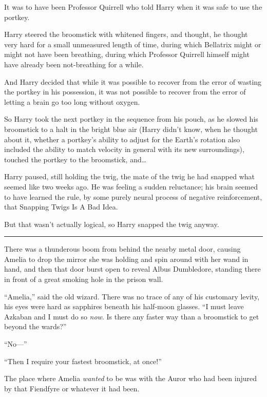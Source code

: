 It was to have been Professor Quirrell who told Harry when it was safe
to use the portkey.

Harry steered the broomstick with whitened fingers, and thought, he
thought very hard for a small unmeasured length of time, during which
Bellatrix might or might not have been breathing, during which Professor
Quirrell himself might have already been not-breathing for a while.

And Harry decided that while it was possible to recover from the error
of wasting the portkey in his possession, it was not possible to recover
from the error of letting a brain go too long without oxygen.

So Harry took the next portkey in the sequence from his pouch, as he
slowed his broomstick to a halt in the bright blue air (Harry didn't
know, when he thought about it, whether a portkey's ability to adjust
for the Earth's rotation also included the ability to match velocity in
general with its new surroundings), touched the portkey to the
broomstick, and\ldots{}

Harry paused, still holding the twig, the mate of the twig he had
snapped what seemed like two weeks ago. He was feeling a sudden
reluctance; his brain seemed to have learned the rule, by some purely
neural process of negative reinforcement, that Snapping Twigs Is A Bad
Idea.

But that wasn't actually logical, so Harry snapped the twig anyway.

\begin{center}\rule{3in}{0.4pt}\end{center}

There was a thunderous boom from behind the nearby metal door, causing
Amelia to drop the mirror she was holding and spin around with her wand
in hand, and then that door burst open to reveal Albus Dumbledore,
standing there in front of a great smoking hole in the prison wall.

``Amelia,'' said the old wizard. There was no trace of any of his
customary levity, his eyes were hard as sapphires beneath his half-moon
glasses. ``I must leave Azkaban and I must do so \emph{now}. Is there
any faster way than a broomstick to get beyond the wards?''

``No---''

``Then I require your fastest broomstick, at once!''

The place where Amelia \emph{wanted} to be was with the Auror who had
been injured by that Fiendfyre or whatever it had been.

